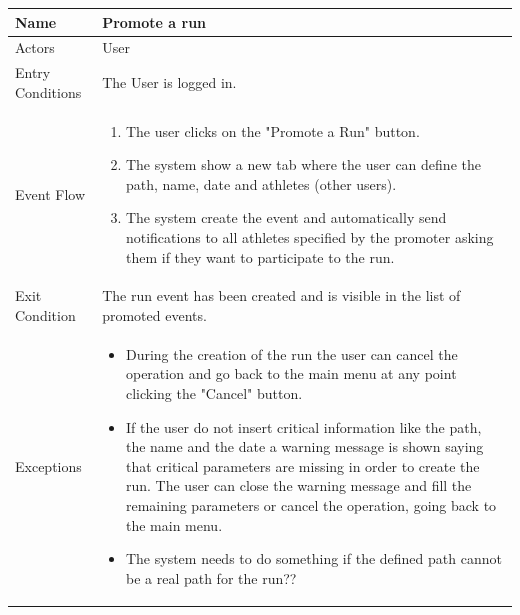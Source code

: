 \begin{enumerate}
\FloatBarrier
\begin{table}[h]
\begin{tabular}{|l|l|}
\hline
Name             & Promote a run \\ \hline
Actors           & User  \\ \hline
Entry Conditions & The User is logged in.    \\ \hline
Event Flow       & \parbox{.45\textwidth}{\begin{enumerate}
            \item The user clicks on the "Promote a Run" button.
            \item The system show a new tab where the user can define the path, name, date and athletes (other users).
            \item The system create the event and automatically send notifications to all athletes specified by the promoter asking them if they want to participate to the run.
        \end{enumerate}}\\ \hline
Exit Condition   & The run event has been created and is visible in the list of promoted events.\\ \hline
Exceptions       & \parbox{.45\textwidth}  
{\begin{itemize}
\item During the creation of the run the user can cancel the operation and go back to the main menu at any point clicking the "Cancel" button.
\item If the user do not insert critical information like the path, the name and the date a warning message is shown saying that critical parameters are missing in order to create the run. The user can close the warning message and fill the remaining parameters or cancel the operation, going back to the main menu.
\item The system needs to do something if the defined path cannot be a real path for the run??
\end{itemize}}\\ \hline
\end{tabular}
\end{table}
\FloatBarrier


\end{enumerate}
